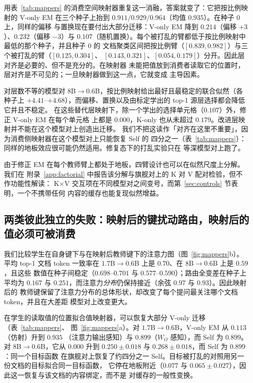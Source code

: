 \documentclass[11pt]{article}
\begin{document}
用表~\ref{tab:mappers} 的消费空间映射器重复这一消融，答案就变了：它把按比例映射的
V-only EM 在三个种子上抬到 $0.911/0.929/0.964$（均值 $0.935$）。在种子 0 上，同样的偏移
与置换现在要付出大部分迁移：V-only EM 降到 $0.214$（偏移 $+3$）、$0.232$（偏移 $-3$）与
$0.107$（随机置换）。每个被打乱的臂都低于按比例映射中最低的那个种子，并且种子 0 的
文档聚类区间把按比例臂（$[0.839, 0.982]$）与三个被打乱的臂（$[0.125, 0.304]$、
$[0.143, 0.321]$、$[0.054, 0.179]$）分开。因此层对齐是必要的、但不是充分的。在映射器
未能把值放到消费者读取它的位置时，层对齐是不可见的；一旦映射器做到这一点，它就变成
主导因素。

对层数不等的模型对 $8$B$\to0.6$B，按比例映射给出最好且最稳定的联合似然（各种子上
$+4.41$--$+4.68$），而偏移、置换以及由标定学出的 top-1 源层选择都会降低它并且不稳定。
在这些替代层映射下，除一个学出的选择单元格（$0.107$）外，修正 V-only EM 在每个单元格
上都是 $0.000$，K-only 也从未超过 $0.179$。改进层映射并不能在这个模型对上创造出迁移。
我们不把这读作「对齐在这里不重要」，因为消费侧映射器在这个模型对上只能恢复 Self 的
四分之一（表~\ref{tab:mappers}）：同样的地板效应很可能仍然适用。修复态下的打乱实验只在
等深模型对上跑了。

由于修正 EM 在每个教师臂上都处于地板，四臂设计也可以在似然尺度上分解。我们在
附录~\ref{app:factorial} 中报告该分解与旗舰对上的 K 对 V 配对检验，但不作功能性解读：
K$\times$V 交互项在不同模型对之间变号，而第~\ref{sec:controls} 节表明，一个不携带任何
内容的缓存也能复现似然增益。

\subsection{两类彼此独立的失败：映射后的键扰动路由，映射后的值必须可被消费}
\label{sec:two-failures}
我们比较学生在自身键下与在映射后教师键下的注意力图（图~\ref{fig:mappers}b）。平均 top-1
文档 token 一致率在 $1.7$B$\to0.6$B 上是 $0.70$、在 $8$B$\to0.6$B 上是 $0.59$，且这些
数值在种子间稳定（$0.698$--$0.701$ 与 $0.577$--$0.590$）；路由全变差在种子上平均为
$0.167$ 与 $0.251$，而注意力\emph{分布}仍保持接近（余弦 $0.97$ 与 $0.93$）。因此映射后的
教师键保留了注意力分布的总体形状，却改变了每个提问最关注哪个文档 token，并且在大差距
模型对上改变更大。

在学生的读取值的位置拟合值映射器，可以恢复大部分 V-only 迁移（表~\ref{tab:mappers}、
图~\ref{fig:mappers}a）。对 $1.7$B$\to0.6$B，V-only EM 从 $0.113$（仿射）升到 $0.935$
（注意力输出感知）与 $0.899$（$W_O$ 感知），而 Self 为 $0.899$。对 $8$B$\to0.6$B，它从
$0.000$ 升到 $0.250 \pm 0.018$ 与 $0.268 \pm 0.018$，而 Self 为 $0.899$：同一个目标函数
在旗舰对上恢复了约四分之一 Self。目标被打乱的对照用另一份文档的目标拟合同一目标函数，
它停在地板附近（$0.077$ 与 $0.065 \pm 0.027$），因此这一恢复与该文档的内容绑定，而不是
对缓存的一般性变换。
\end{document}
